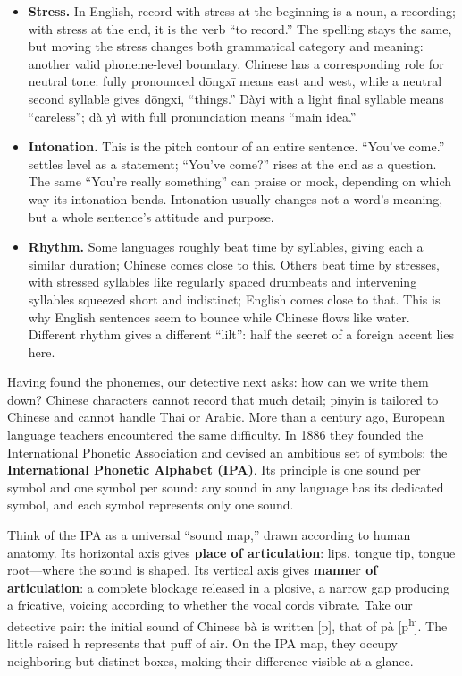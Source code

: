 \begin{itemize}
\item \textbf{Stress.} In English, record with stress at the beginning is a noun, a recording; with stress at the end, it is the verb ``to record.'' The spelling stays the same, but moving the stress changes both grammatical category and meaning: another valid phoneme-level boundary. Chinese has a corresponding role for neutral tone: fully pronounced dōngxī means east and west, while a neutral second syllable gives dōngxi, ``things.'' Dàyi with a light final syllable means ``careless''; dà yì with full pronunciation means ``main idea.''
\item \textbf{Intonation.} This is the pitch contour of an entire sentence. ``You've come.'' settles level as a statement; ``You've come?'' rises at the end as a question. The same ``You're really something'' can praise or mock, depending on which way its intonation bends. Intonation usually changes not a word's meaning, but a whole sentence's attitude and purpose.
\item \textbf{Rhythm.} Some languages roughly beat time by syllables, giving each a similar duration; Chinese comes close to this. Others beat time by stresses, with stressed syllables like regularly spaced drumbeats and intervening syllables squeezed short and indistinct; English comes close to that. This is why English sentences seem to bounce while Chinese flows like water. Different rhythm gives a different ``lilt'': half the secret of a foreign accent lies here.
\end{itemize}
Having found the phonemes, our detective next asks: how can we write them down? Chinese characters cannot record that much detail; pinyin is tailored to Chinese and cannot handle Thai or Arabic. More than a century ago, European language teachers encountered the same difficulty. In 1886 they founded the International Phonetic Association and devised an ambitious set of symbols: the \textbf{International Phonetic Alphabet (IPA)}. Its principle is one sound per symbol and one symbol per sound: any sound in any language has its dedicated symbol, and each symbol represents only one sound.

Think of the IPA as a universal ``sound map,'' drawn according to human anatomy. Its horizontal axis gives \textbf{place of articulation}: lips, tongue tip, tongue root---where the sound is shaped. Its vertical axis gives \textbf{manner of articulation}: a complete blockage released in a plosive, a narrow gap producing a fricative, voicing according to whether the vocal cords vibrate. Take our detective pair: the initial sound of Chinese bà is written [p], that of pà [p\textsuperscript{h}]. The little raised h represents that puff of air. On the IPA map, they occupy neighboring but distinct boxes, making their difference visible at a glance.

